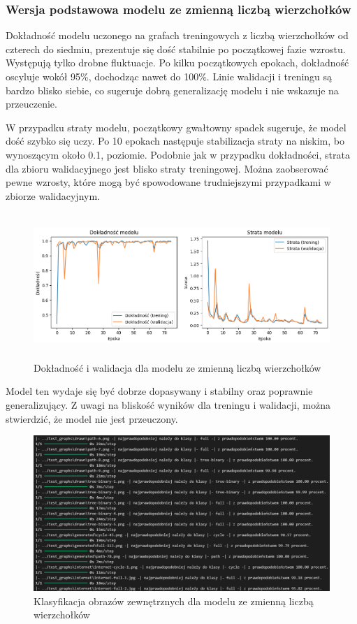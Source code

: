 \subsubsection{Wersja podstawowa modelu ze zmienną liczbą wierzchołków}

Dokładność modelu uczonego na grafach treningowych z liczbą wierzchołków od czterech do siedmiu,
prezentuje się dość stabilnie po początkowej fazie wzrostu. Występują tylko drobne fluktuacje.
Po kilku początkowych epokach, dokładność oscyluje wokół 95\%, dochodząc nawet do 100\%.
Linie walidacji i treningu są bardzo blisko siebie, co sugeruje dobrą generalizację modelu
i nie wskazuje na przeuczenie.

W przypadku straty modelu, początkowy gwałtowny spadek sugeruje, że model dość szybko się uczy.
Po 10 epokach następuje stabilizacja straty na niskim, bo wynoszącym około 0.1, poziomie.
Podobnie jak w przypadku dokładności, strata dla zbioru walidacyjnego jest blisko straty treningowej.
Można zaobserować pewne wzrosty, które mogą być spowodowane trudniejszymi przypadkami w zbiorze walidacyjnym.

\begin{figure}[ht]
	\centering
	\includegraphics[height=5.5cm]{resources/tests/images/v3/multiple_edges_img.png}
	\caption{Dokładność i walidacja dla modelu ze zmienną liczbą wierzchołków}
	\label{Fig:tests-var-0a}
\end{figure}
\FloatBarrier

Model ten wydaje się być dobrze dopasywany i stabilny oraz poprawnie generalizujący.
Z uwagi na bliskość wyników dla treningu i walidacji, można stwierdzić, że model nie jest przeuczony.

\begin{figure}[ht]
	\centering
	\includegraphics[width=14cm]{resources/tests/images/v3/multiple_edges_txt.png}
	\caption{Klasyfikacja obrazów zewnętrznych dla modelu ze zmienną liczbą wierzchołków}
	\label{Fig:tests-var-0b}
\end{figure}
\FloatBarrier

